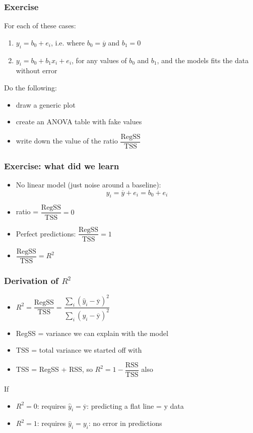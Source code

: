 \begin{frame}\frametitle{Exercise}

	For each of these cases:
	\begin{enumerate}
		\item	$y_i = b_0 + e_i$, i.e. where $b_0 = \overline{y}$ and $b_1 = 0$
		\item	$y_i = b_0 + b_1 x_i + e_i$, for any values of $b_0$ and $b_1$, and the models fits the data without error
	\end{enumerate}

	\vspace{12pt}
	Do the following:
	\begin{itemize}
		\item	draw a generic plot
		\item	create an ANOVA table with fake values
		\item	write down the value of the ratio $\dfrac{\text{RegSS}}{\text{TSS}}$
	\end{itemize}
\end{frame}

\begin{frame}\frametitle{Exercise: what did we learn}
	\begin{itemize}
		\item	No linear model (just noise around a baseline): 
		$$y_i = \overline{y} + e_i = b_0 + e_i$$
		
		\item	ratio = $\dfrac{\text{RegSS}}{\text{TSS}} = 0$
		\item	Perfect predictions: $\dfrac{\text{RegSS}}{\text{TSS}} = 1$
		\item	$\dfrac{\text{RegSS}}{\text{TSS}} = R^2$
	\end{itemize}
\end{frame}

\begin{frame}\frametitle{Derivation of $R^2$}
	\begin{itemize}
		\item	$R^2 = \dfrac{\text{RegSS}}{\text{TSS}} = \dfrac{\sum_i{ \left(\hat{y}_i - \overline{\mathrm{y}}\right)^2}}{\sum_i{ \left(y_i - \overline{\mathrm{y}}\right)^2}}$
		\item	RegSS = variance we can explain with the model
		\item	TSS = total variance we started off with
		\item	TSS = RegSS + RSS, so $R^2 = 1-\dfrac{\text{RSS}}{\text{TSS}}$ also
	\end{itemize}

	If
	\begin{itemize}
		\item	$R^2 = 0$: requires $\hat{y}_i = \overline{\mathrm{y}}$: predicting a flat line = $\mathrm{y}$ data
		\item	$R^2 = 1$: requires $\hat{y}_i = y_i$: no error in predictions
	\end{itemize}
\end{frame}

